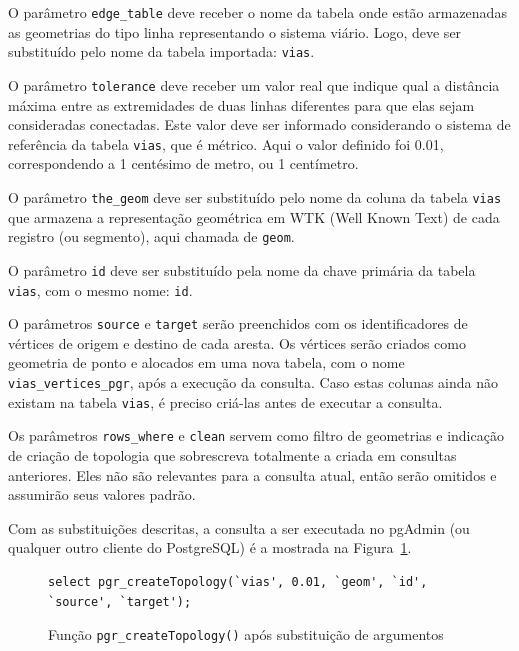 \documentclass[oneside,openright,12pt]{ufsm_2015} %
\begin{document}
O parâmetro {\tt edge\_table} deve receber o nome da tabela onde estão armazenadas as geometrias do tipo linha representando o sistema viário. 
Logo, deve ser substituído pelo nome da tabela importada: {\tt vias}.

O parâmetro {\tt tolerance} deve receber um valor real que indique qual a distância máxima entre as extremidades de duas linhas diferentes para que elas sejam consideradas conectadas. 
Este valor deve ser informado considerando o sistema de referência da tabela {\tt vias}, que é métrico. Aqui o valor definido foi 0.01, correspondendo a 1 centésimo de metro, ou 1 centímetro.

O parâmetro {\tt the\_geom} deve ser substituído pelo nome da coluna da tabela {\tt vias} que armazena a representação geométrica em WTK (Well Known Text) de cada registro (ou segmento), aqui chamada de {\tt geom}.

O parâmetro {\tt id} deve ser substituído pela nome da chave primária da tabela {\tt vias}, com o mesmo nome: {\tt id}.

O parâmetros {\tt source} e {\tt target} serão preenchidos com os identificadores de vértices de origem e destino de cada aresta. 
Os vértices serão criados como geometria de ponto e alocados em uma nova tabela, com o nome {\tt vias\_vertices\_pgr}, após a execução da consulta. Caso estas colunas ainda não existam na tabela {\tt vias}, é preciso criá-las antes de executar a consulta.

Os parâmetros {\tt rows\_where} e {\tt clean} servem como filtro de geometrias e indicação de criação de topologia que sobrescreva totalmente a criada em consultas anteriores. Eles não são relevantes para a consulta atual, então serão omitidos e assumirão seus valores padrão.

Com as substituições descritas, a consulta a ser executada no pgAdmin (ou qualquer outro cliente do PostgreSQL) é a mostrada na Figura~\ref{codigo:create_topology_final}.

\begin{figure}[h!]
    \centering
    \begin{lstlisting}[]
    select pgr_createTopology(`vias', 0.01, `geom', `id', `source', `target');
\end{lstlisting}
    \caption{Função {\tt pgr\_createTopology()} após substituição de argumentos}
    \label{codigo:create_topology_final}
\end{figure}
\end{document}
